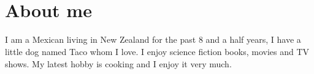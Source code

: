 \documentclass{resume}
\begin{document}
\section{\\ About me}
  \role{}{}
  I am a Mexican living in New Zealand for the past 8 and a half years, I have a little dog named {Taco} whom I love. I enjoy science fiction books, movies and TV shows. My latest hobby is cooking and I enjoy it very much.\par
  ~\par

%
%
\end{document}
